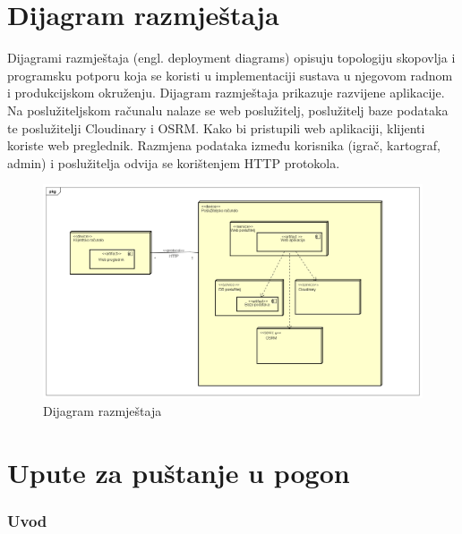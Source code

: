 				
			\eject 
		
		
		\section{Dijagram razmještaja}
			
			
			
			{Dijagrami razmještaja (engl. deployment diagrams) opisuju topologiju skopovlja i programsku potporu koja se koristi u implementaciji sustava u njegovom radnom i produkcijskom okruženju. Dijagram razmještaja prikazuje razvijene aplikacije. Na poslužiteljskom računalu nalaze se web poslužitelj, poslužitelj baze podataka te poslužitelji Cloudinary i OSRM. Kako bi pristupili web aplikaciji, klijenti koriste web preglednik. Razmjena podataka između korisnika (igrač, kartograf, admin) i poslužitelja odvija se korištenjem HTTP protokola.}
			\begin{figure}[H]
				\includegraphics[width=\textwidth]{dijagrami/dijagram_razmjestaja} 
				\centering
				\caption{Dijagram razmještaja}
				\label{}
			\end{figure}
			\eject 
		
		\section{Upute za puštanje u pogon}
		
			\subsubsection{Uvod}
		
